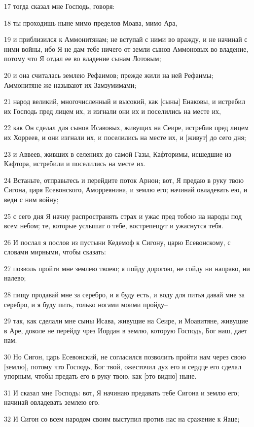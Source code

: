 \par 17 тогда сказал мне Господь, говоря:
\par 18 ты проходишь ныне мимо пределов Моава, мимо Ара,
\par 19 и приблизился к Аммонитянам; не вступай с ними во вражду, и не начинай с ними войны, ибо Я не дам тебе ничего от земли сынов Аммоновых во владение, потому что Я отдал ее во владение сынам Лотовым;
\par 20 и она считалась землею Рефаимов; прежде жили на ней Рефаимы; Аммонитяне же называют их Замзумимами;
\par 21 народ великий, многочисленный и высокий, как [сыны] Енаковы, и истребил их Господь пред лицем их, и изгнали они их и поселились на месте их,
\par 22 как Он сделал для сынов Исавовых, живущих на Сеире, истребив пред лицем их Хорреев, и они изгнали их, и поселились на месте их, и [живут] до сего дня;
\par 23 и Аввеев, живших в селениях до самой Газы, Кафторимы, исшедшие из Кафтора, истребили и поселились на месте их.
\par 24 Встаньте, отправьтесь и перейдите поток Арнон; вот, Я предаю в руку твою Сигона, царя Есевонского, Аморреянина, и землю его; начинай овладевать ею, и веди с ним войну;
\par 25 с сего дня Я начну распространять страх и ужас пред тобою на народы под всем небом; те, которые услышат о тебе, вострепещут и ужаснутся тебя.
\par 26 И послал я послов из пустыни Кедемоф к Сигону, царю Есевонскому, с словами мирными, чтобы сказать:
\par 27 позволь пройти мне землею твоею; я пойду дорогою, не сойду ни направо, ни налево;
\par 28 пищу продавай мне за серебро, и я буду есть, и воду для питья давай мне за серебро, и я буду пить, только ногами моими пройду--
\par 29 так, как сделали мне сыны Исава, живущие на Сеире, и Моавитяне, живущие в Аре, доколе не перейду чрез Иордан в землю, которую Господь, Бог наш, дает нам.
\par 30 Но Сигон, царь Есевонский, не согласился позволить пройти нам через свою [землю], потому что Господь, Бог твой, ожесточил дух его и сердце его сделал упорным, чтобы предать его в руку твою, как [это видно] ныне.
\par 31 И сказал мне Господь: вот, Я начинаю предавать тебе Сигона и землю его; начинай овладевать землею его.
\par 32 И Сигон со всем народом своим выступил против нас на сражение к Яаце;
